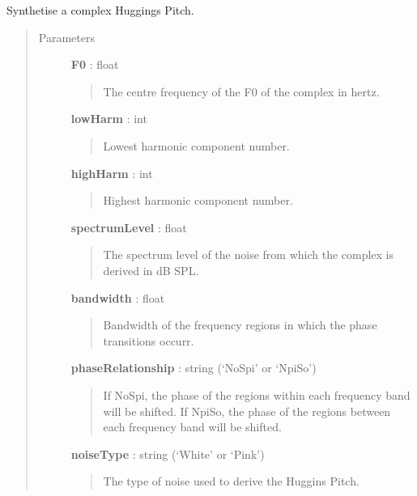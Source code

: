 \documentclass[a4paper,12pt,english]{sphinxmanual}
\begin{document}
\begin{fulllineitems}
\label{sndlib:sndlib.makeHuggins}
Synthetise a complex Huggings Pitch.
\begin{quote}\begin{description}
\item[{Parameters }] \leavevmode
\textbf{F0} : float
\begin{quote}

The centre frequency of the F0 of the complex in hertz.
\end{quote}

\textbf{lowHarm} : int
\begin{quote}

Lowest harmonic component number.
\end{quote}

\textbf{highHarm} : int
\begin{quote}

Highest harmonic component number.
\end{quote}

\textbf{spectrumLevel} : float
\begin{quote}

The spectrum level of the noise from which
the complex is derived in dB SPL.
\end{quote}

\textbf{bandwidth} : float
\begin{quote}

Bandwidth of the frequency regions in which the
phase transitions occurr.
\end{quote}

\textbf{phaseRelationship} : string (`NoSpi' or `NpiSo')
\begin{quote}

If NoSpi, the phase of the regions within each frequency band will
be shifted. If NpiSo, the phase of the regions between each
frequency band will be shifted.
\end{quote}

\textbf{noiseType} : string (`White' or `Pink')
\begin{quote}

The type of noise used to derive the Huggins Pitch.
\end{quote}


\end{description}
\end{quote}
\end{fulllineitems}
\end{document}
